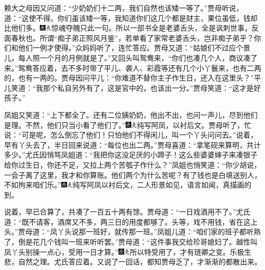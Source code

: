 赖大之母因又问道：``少奶奶们十二两，我们自然也该矮一等了。''贾母听说，道：``这使不得。你们虽该矮一等，我知道你们这几个都是财主，果位虽低，钱却比他们多。{\includegraphics[width=3mm]{../Images/00004}\includegraphics[width=3mm]{../Images/00012}\footnotesize \kaishu 惊魂夺魄只此一句。所以一部书全是老婆舌头，全是讽刺世事，反面春秋也。所谓``痴子弟正照风月鉴''，若单看了家常老婆舌头，岂非痴子弟乎？}你们和他们一例才使得。''众妈妈听了，连忙答应。贾母又道：``姑娘们不过应个景儿，每人照一个月的月例就是了。''又回头叫鸳鸯来，``你们也凑几个人，商议凑了来。''鸳鸯答应着，去不多时带了平儿、袭人、彩霞等还有几个小丫鬟来，也有二两的，也有一两的。贾母因问平儿：``你难道不替你主子作生日，还入在这里头？''平儿笑道：``我那个私自另外有了，这是官中的，也该出一分。''贾母笑道：``这才是好孩子。''

凤姐又笑道：``上下都全了。还有二位姨奶奶，他出不出，也问一声儿，尽到他们是理。不然，他们只当小看了他们了。''{\includegraphics[width=3mm]{../Images/00004}\includegraphics[width=3mm]{../Images/00012}\footnotesize \kaishu 纯写阿凤，以衬后文。}贾母听了，忙说：``可是呢，怎么倒忘了他们！只怕他们不得闲儿，叫一个丫头问问去。''说着，早有丫头去了，半日回来说道：``每位也出二两。''贾母喜道：``拿笔砚来算明，共计多少。''尤氏因悄骂凤姐道：``我把你这没足厌的小蹄子！这么些婆婆婶子来凑银子给你过生日，你还不足，又拉上两个苦瓠子作什么？''凤姐也悄笑道：``你少胡说，一会子离了这里，我才和你算账。他们两个为什么苦呢？有了钱也是白填送别人，不如拘来咱们乐。''{\includegraphics[width=3mm]{../Images/00004}\includegraphics[width=3mm]{../Images/00012}\footnotesize \kaishu 纯写阿凤以衬后文，二人形景如见，语言如闻，真描画的到。}

说着，早已合算了，共凑了一百五十两有馀。贾母道：``一日戏酒用不了。''尤氏道：``既不请客，酒席又不多，两三日的用度都够了。头等，戏不用钱，省在这上头。''贾母道：``凤丫头说那一班好，就传那一班。''凤姐儿道：``咱们家的班子都听熟了，倒是花几个钱叫一班来听听罢。''贾母道：``这件事我交给珍哥媳妇了。越性叫凤丫头别操一点心，受用一日才算。''{\includegraphics[width=3mm]{../Images/00004}\includegraphics[width=3mm]{../Images/00012}\footnotesize \kaishu 所以特受用了，才有琏卿之变。乐极生悲，自然之理。}尤氏答应着。又说了一回话，都知贾母乏了，才渐渐的都散出来。

